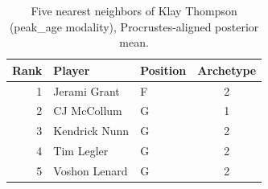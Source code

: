 \begin{table}[htbp]
  \centering\small
  \begin{tabular}{rllc}
    \toprule
    Rank & Player & Position & Archetype \\
    \midrule
    1 & Jerami Grant & F & 2 \\
    2 & CJ McCollum & G & 1 \\
    3 & Kendrick Nunn & G & 2 \\
    4 & Tim Legler & G & 2 \\
    5 & Voshon Lenard & G & 2 \\
    \bottomrule
  \end{tabular}
  \caption{Five nearest neighbors of Klay Thompson (peak_age modality), Procrustes-aligned posterior mean.}
  \label{tab:Klay_Thompson_neighbors_peak_age}
\end{table}

